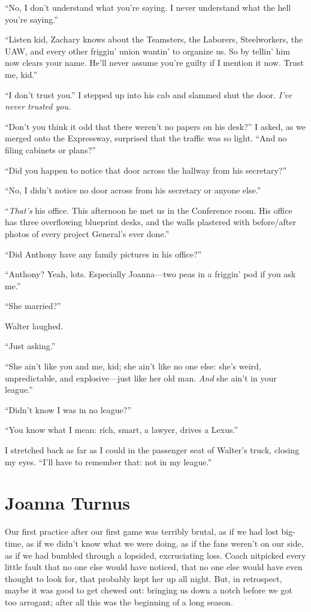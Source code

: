 ``No, I don't understand what you're saying. I never understand what the
hell you're saying.''

``Listen kid, Zachary knows about the Teamsters, the Laborers,
Steelworkers, the UAW, and every other friggin' union wantin' to
organize us. So by tellin' him now clears your name. He'll never assume
you're guilty if I mention it now. Trust me, kid.''

``I don't trust you.'' I stepped up into his cab and slammed shut the
door. \emph{I've never trusted you.}

``Don't you think it odd that there weren't no papers on his desk?'' I
asked, as we merged onto the Expressway, surprised that the traffic was
so light. ``And no filing cabinets or plans?''

``Did you happen to notice that door across the hallway from his
secretary?''

``No, I didn't notice no door across from his secretary or anyone
else.''

``\emph{That's} his office. This afternoon he met us in the Conference
room. His office has three overflowing blueprint desks, and the walls
plastered with before/after photos of every project General's ever
done.''

``Did Anthony have any family pictures in his office?''

``Anthony? Yeah, lots. Especially Joanna---two peas in a friggin' pod if
you ask me.''

``She married?''

Walter laughed.

``Just asking.''

``She ain't like you and me, kid; she ain't like no one else: she's
weird, unpredictable, and explosive---just like her old man. \emph{And}
she ain't in your league.''

``Didn't know I was in no league?''

``You know what I mean: rich, smart, a lawyer, drives a Lexus.''

I stretched back as far as I could in the passenger seat of Walter's
truck, closing my eyes. ``I'll have to remember that: not in my
league.''

\chapter{Joanna Turnus}

\titlemark

Our first practice after our first game was terribly brutal, as if we
had lost big-time, as if we didn't know what we were doing, as if the
fans weren't on our side, as if we had bumbled through a lopsided,
excruciating loss. Coach nitpicked every little fault that no one else
would have noticed, that no one else would have even thought to look
for, that probably kept her up all night. But, in retrospect, maybe it
was good to get chewed out: bringing us down a notch before we got too
arrogant; after all this was the beginning of a long season.

